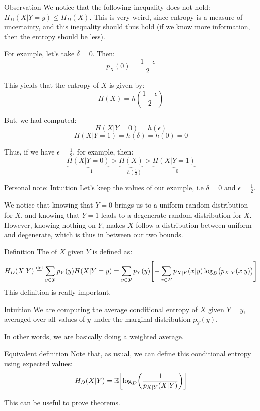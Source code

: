 \documentclass[a4paper]{article}
\begin{document}
\begin{parag}{Observation}
    We notice that the following inequality does not hold: $H_D\left(X|Y=y\right) \leq H_D\left(X\right)$. This is very weird, since entropy is a measure of uncertainty, and this inequality should thus hold (if we know more information, then the entropy should be less).

    For example, let's take $\delta = 0$. Then:
    \[p_X\left(0\right) = \frac{1 - \epsilon}{2}\]

    This yields that the entropy of $X$ is given by:
    \[H\left(X\right) = h\left(\frac{1 - \epsilon}{2}\right)\]

    But, we had computed:
    \[H\left(X|Y = 0\right) = h\left(\epsilon\right)\]
    \[H\left(X|Y = 1\right) = h\left(\delta\right) = h\left(0\right) = 0\]

    Thus, if we have $\epsilon = \frac{1}{2}$, for example, then:
    \[\underbrace{H\left(X| Y = 0\right)}_{= 1} > \underbrace{H\left(X\right)}_{= h\left(\frac{1}{4}\right)} > \underbrace{H\left(X |Y=1\right)}_{= 0}\]

    \begin{subparag}{Personal note: Intuition}
        Let's keep the values of our example, i.e $\delta = 0$ and $\epsilon = \frac{1}{2}$.

        We notice that knowing that $Y = 0$ brings us to a uniform random distribution for $X$, and knowing that $Y = 1$ leads to a degenerate random distribution for $X$. However, knowing nothing on $Y$, makes $X$ follow a distribution between uniform and degenerate, which is thus in between our two bounds.
    \end{subparag}

\end{parag}

\begin{parag}{Definition}
    The  of $X$ given $Y$ is defined as:
    \[H_D\left(X|Y\right) \over{=}{def} \sum_{y \in \mathcal{Y}}^{} p_Y\left(y\right) H\left(X|Y=y\right) = \sum_{y \in \mathcal{Y}}^{} p_Y\left(y\right) \left[-\sum_{x \in \mathcal{X}}^{} p_{X|Y}\left(x|y\right) \log_D\left(p_{X|Y}\left(x|y\right)\right)\right]\]
    This definition is really important.

    \begin{subparag}{Intuition}
        We are computing the average conditional entropy of $X$ given $Y = y$, averaged over all values of $y$ under the marginal distribution $p_Y\left(y\right)$.

        In other words, we are basically doing a weighted average.
    \end{subparag}

    \begin{subparag}{Equivalent definition}
        Note that, as usual, we can define this conditional entropy using expected values:
        \[H_D\left(X|Y\right) = \exval\left[\log_D\left(\frac{1}{p_{X|Y}\left(X|Y\right)}\right)\right]\]

        This can be useful to prove theorems.
    \end{subparag}


\end{parag}
\end{document}
